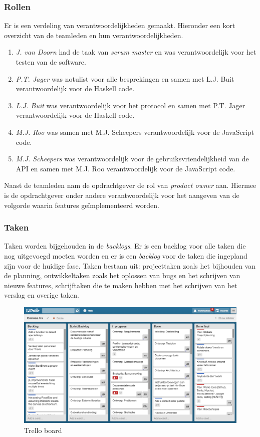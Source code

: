\subsubsection{Rollen}
Er is een verdeling van verantwoordelijkheden gemaakt. Hieronder een kort overzicht van de teamleden en hun verantwoordelijkheden.
\begin{enumerate}
    \item \emph{J. van Doorn} had de taak van \emph{scrum master} en was verantwoordelijk voor het testen van de software.
    \item \emph{P.T. Jager} was notulist voor alle besprekingen en samen met L.J. Buit verantwoordelijk voor de Haskell code.
    \item \emph{L.J. Buit} was verantwoordelijk voor het protocol en samen met P.T. Jager verantwoordelijk voor de Haskell code.
    \item \emph{M.J. Roo} was samen met M.J. Scheepers verantwoordelijk voor de JavaScript code.
    \item \emph{M.J. Scheepers} was verantwoordelijk voor de gebruiksvriendelijkheid van de API en samen met M.J. Roo verantwoordelijk voor de JavaScript code.
\end{enumerate}
Naast de teamleden nam de opdrachtgever de rol van \emph{product owner} aan. Hiermee is de opdrachtgever onder andere verantwoordelijk voor het aangeven van de volgorde waarin features ge\"implementeerd worden.

\subsubsection{Taken}
Taken worden bijgehouden in de \emph{backlogs}. Er is een backlog voor alle taken die nog uitgevoegd moeten worden en er is een \emph{backlog} voor de taken die ingepland zijn voor de huidige fase. Taken bestaan uit: projecttaken zoals het bijhouden van de planning, ontwikkeltaken zoals het oplossen van bugs en het schrijven van nieuwe features, schrijftaken die te maken hebben met het schrijven van het verslag en overige taken.

\begin{figure}[H]
\begin{center}
\includegraphics[keepaspectratio,width=\textwidth]{./images/trello.png}
\caption{Trello board}
\label{fig:trello}
\end{center}
\end{figure}

